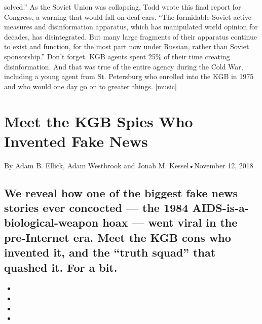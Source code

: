 \begin{itemize}
  solved.'' As the Soviet Union was collapsing, Todd wrote this final
  report for Congress, a warning that would fall on deaf ears. ``The
  formidable Soviet active measures and disinformation apparatus, which
  has manipulated world opinion for decades, has disintegrated. But many
  large fragments of their apparatus continue to exist and function, for
  the most part now under Russian, rather than Soviet sponsorship.''
  Don't forget. KGB agents spent 25\% of their time creating
  disinformation. And that was true of the entire agency during the Cold
  War, including a young agent from St. Petersburg who enrolled into the
  KGB in 1975 and who would one day go on to greater things. {[}music{]}
\end{itemize}

\hypertarget{meet-the-kgb-spies-who-invented-fake-news-1}{%
\section{Meet the KGB Spies Who Invented Fake
News}\label{meet-the-kgb-spies-who-invented-fake-news-1}}

By Adam B. Ellick, Adam Westbrook and Jonah M. Kessel•November 12, 2018

\hypertarget{we-reveal-how-one-of-the-biggest-fake-news-stories-ever-concocted--the-1984-aids-is-a-biological-weapon-hoax--went-viral-in-the-pre-internet-era-meet-the-kgb-cons-who-invented-it-and-the-truth-squad-that-quashed-it-for-a-bit-1}{%
\subsection{We reveal how one of the biggest fake news stories ever
concocted --- the 1984 AIDS-is-a-biological-weapon hoax --- went viral
in the pre-Internet era. Meet the KGB cons who invented it, and the
``truth squad'' that quashed it. For a
bit.}\label{we-reveal-how-one-of-the-biggest-fake-news-stories-ever-concocted--the-1984-aids-is-a-biological-weapon-hoax--went-viral-in-the-pre-internet-era-meet-the-kgb-cons-who-invented-it-and-the-truth-squad-that-quashed-it-for-a-bit-1}}

\begin{itemize}
\item
\item
\item
\item
\end{itemize}

